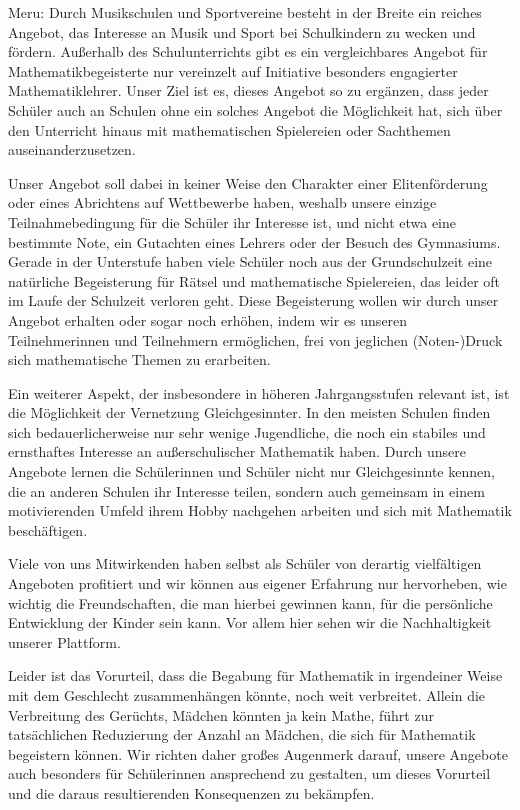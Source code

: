 \documentclass[12pt]{zettel}
\begin{document}
\begin{small}
Meru:
Durch Musikschulen und Sportvereine besteht in der Breite ein reiches
Angebot, das Interesse an Musik und Sport bei Schulkindern zu wecken und
fördern. Außerhalb des Schulunterrichts gibt es ein vergleichbares
Angebot für Mathematikbegeisterte nur vereinzelt auf
Initiative besonders engagierter Mathematiklehrer. Unser Ziel ist es,
dieses Angebot so zu ergänzen, dass jeder Schüler auch an Schulen ohne
ein solches Angebot die Möglichkeit hat, sich über den Unterricht
hinaus mit mathematischen Spielereien oder Sachthemen
auseinanderzusetzen.

Unser Angebot soll dabei in keiner Weise den Charakter einer
Elitenförderung oder eines Abrichtens auf Wettbewerbe haben, weshalb
unsere einzige Teilnahmebedingung für die Schüler ihr Interesse ist,
und nicht etwa eine bestimmte Note, ein Gutachten eines Lehrers
oder der Besuch des Gymnasiums. Gerade in der Unterstufe haben viele
Schüler noch aus der Grundschulzeit eine natürliche Begeisterung für
Rätsel und mathematische Spielereien, das leider oft im Laufe der
Schulzeit verloren geht. Diese Begeisterung wollen wir
durch unser Angebot erhalten oder sogar noch erhöhen, indem wir es
unseren Teilnehmerinnen und Teilnehmern ermöglichen, frei von jeglichen
(Noten-)Druck sich mathematische Themen zu erarbeiten.

Ein weiterer Aspekt, der insbesondere in höheren Jahrgangsstufen
relevant ist, ist die Möglichkeit der Vernetzung Gleichgesinnter. In
den meisten Schulen finden sich bedauerlicherweise nur sehr wenige
Jugendliche, die noch ein stabiles und ernsthaftes Interesse an
außerschulischer Mathematik haben. Durch unsere Angebote lernen die
Schülerinnen und Schüler nicht nur Gleichgesinnte kennen, die an
anderen Schulen ihr Interesse teilen, sondern auch gemeinsam in einem
motivierenden Umfeld ihrem Hobby nachgehen arbeiten und
sich mit Mathematik beschäftigen.

Viele von uns Mitwirkenden haben selbst als Schüler von derartig
vielfältigen Angeboten profitiert und wir können aus eigener Erfahrung nur
hervorheben, wie wichtig die Freundschaften, die man hierbei gewinnen kann,
für die persönliche Entwicklung der Kinder sein kann. Vor allem hier sehen
wir die Nachhaltigkeit unserer Plattform.

Leider ist das Vorurteil, dass die Begabung für Mathematik in
irgendeiner Weise mit dem Geschlecht zusammenhängen könnte, noch weit
verbreitet. Allein die Verbreitung des Gerüchts, Mädchen könnten ja
kein Mathe, führt zur tatsächlichen Reduzierung der Anzahl
an Mädchen, die sich für Mathematik begeistern können. Wir richten
daher großes Augenmerk darauf, unsere Angebote auch besonders für
Schülerinnen ansprechend zu gestalten, um dieses Vorurteil und die
daraus resultierenden Konsequenzen zu bekämpfen.
\end{small}
\end{document}
